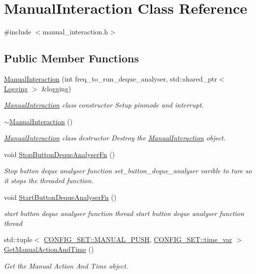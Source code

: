 \hypertarget{classManualInteraction}{}\section{Manual\+Interaction Class Reference}
\label{classManualInteraction}


{\ttfamily \#include $<$manual\+\_\+interaction.\+h$>$}

\subsection*{Public Member Functions}
\begin{DoxyCompactItemize}
\item 
\hyperlink{classManualInteraction_a6cad93bd00e4954a8eedacf590038f68}{Manual\+Interaction} (int freq\+\_\+to\+\_\+run\+\_\+deque\+\_\+analyser, std\+::shared\+\_\+ptr$<$ \hyperlink{classLogging}{Logging} $>$ \&logging)
\begin{DoxyCompactList}\small\item\em \hyperlink{classManualInteraction}{Manual\+Interaction} class constructor Setup pinmode and interrupt. \end{DoxyCompactList}\item 
\hyperlink{classManualInteraction_a761406994ea72ce26d6bef061fb5ae2b}{$\sim$\+Manual\+Interaction} ()
\begin{DoxyCompactList}\small\item\em \hyperlink{classManualInteraction}{Manual\+Interaction} class destructor Destroy the \hyperlink{classManualInteraction}{Manual\+Interaction} object. \end{DoxyCompactList}\item 
void \hyperlink{classManualInteraction_a251516a6a71bd8a966cfa771733e501b}{Stop\+Button\+Deque\+Analyser\+Fn} ()
\begin{DoxyCompactList}\small\item\em Stop button deque analyser function set\+\_\+button\+\_\+deque\+\_\+analyser varible to ture so it stops the threaded function. \end{DoxyCompactList}\item 
void \hyperlink{classManualInteraction_a699be8c82fda18597d11caf8f3a07fe8}{Start\+Button\+Deque\+Analyser\+Fn} ()
\begin{DoxyCompactList}\small\item\em start button deque analyser function thread start button deque analyser function thread \end{DoxyCompactList}\item 
std\+::tuple$<$ \hyperlink{namespaceCONFIG__SET_a627706be626fd4e58c539ed120c27748}{C\+O\+N\+F\+I\+G\+\_\+\+S\+E\+T\+::\+M\+A\+N\+U\+A\+L\+\_\+\+P\+U\+SH}, \hyperlink{namespaceCONFIG__SET_a8816a22e7885d027a52bfa0d24fa9008}{C\+O\+N\+F\+I\+G\+\_\+\+S\+E\+T\+::time\+\_\+var} $>$ \hyperlink{classManualInteraction_ae1279a3bd154b517aa9ad701a93f88c6}{Get\+Manual\+Action\+And\+Time} ()
\begin{DoxyCompactList}\small\item\em Get the Manual Action And Time object. \end{DoxyCompactList}\end{DoxyCompactItemize}
